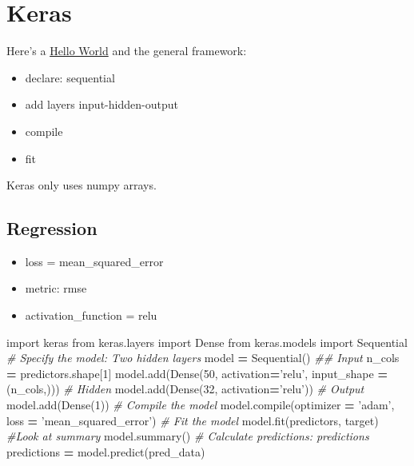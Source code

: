 \documentclass[]{book}
\newenvironment{Shaded}{\begin{snugshade}}{\end{snugshade}}
\newcommand{\DecValTok}[1]{\textcolor[rgb]{0.00,0.00,0.81}{#1}}
\newcommand{\StringTok}[1]{\textcolor[rgb]{0.31,0.60,0.02}{#1}}
\newcommand{\ImportTok}[1]{#1}
\newcommand{\CommentTok}[1]{\textcolor[rgb]{0.56,0.35,0.01}{\textit{#1}}}
\newcommand{\OperatorTok}[1]{\textcolor[rgb]{0.81,0.36,0.00}{\textbf{#1}}}
\newcommand{\BuiltInTok}[1]{#1}
\newcommand{\NormalTok}[1]{#1}
\begin{document}
\section{Keras}\label{keras}

Here's a
\href{https://github.com/fastforwardlabs/keras-hello-world/blob/master/kerashelloworld.ipynb}{Hello
World} and the general framework:

\begin{itemize}
\item
  declare: sequential
\item
  add layers input-hidden-output
\item
  compile
\item
  fit
\end{itemize}

Keras only uses numpy arrays.

\subsection{Regression}\label{regression}

\begin{itemize}
\item
  loss = mean\_squared\_error
\item
  metric: rmse
\item
  activation\_function = relu
\end{itemize}

\begin{Shaded}
\begin{Highlighting}[]
\ImportTok{import}\NormalTok{ keras}
\ImportTok{from}\NormalTok{ keras.layers }\ImportTok{import}\NormalTok{ Dense}
\ImportTok{from}\NormalTok{ keras.models }\ImportTok{import}\NormalTok{ Sequential}
\CommentTok{# Specify the model: Two hidden layers}
\NormalTok{model }\OperatorTok{=}\NormalTok{ Sequential()}
\CommentTok{## Input}
\NormalTok{n_cols }\OperatorTok{=}\NormalTok{ predictors.shape[}\DecValTok{1}\NormalTok{]}
\NormalTok{model.add(Dense(}\DecValTok{50}\NormalTok{, activation}\OperatorTok{=}\StringTok{'relu'}\NormalTok{, input_shape }\OperatorTok{=}\NormalTok{ (n_cols,)))}
\CommentTok{# Hidden}
\NormalTok{model.add(Dense(}\DecValTok{32}\NormalTok{, activation}\OperatorTok{=}\StringTok{'relu'}\NormalTok{))}
\CommentTok{# Output}
\NormalTok{model.add(Dense(}\DecValTok{1}\NormalTok{))}
\CommentTok{# Compile the model}
\NormalTok{model.}\BuiltInTok{compile}\NormalTok{(optimizer }\OperatorTok{=} \StringTok{'adam'}\NormalTok{, loss }\OperatorTok{=} \StringTok{'mean_squared_error'}\NormalTok{) }
\CommentTok{# Fit the model}
\NormalTok{model.fit(predictors, target)}
\CommentTok{#Look at summary}
\NormalTok{model.summary()}
\CommentTok{# Calculate predictions: predictions}
\NormalTok{predictions }\OperatorTok{=}\NormalTok{ model.predict(pred_data)}
\end{Highlighting}
\end{Shaded}
\end{document}

